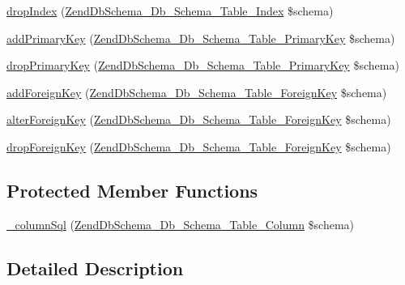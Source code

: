 \begin{DoxyCompactItemize}
\hyperlink{classZendDbSchema__Db__Schema__Generator__Pgsql__Table_ae41ebe29e67b8bf25465242d56d2db96}{drop\-Index} (\hyperlink{classZendDbSchema__Db__Schema__Table__Index}{Zend\-Db\-Schema\-\_\-\-Db\-\_\-\-Schema\-\_\-\-Table\-\_\-\-Index} \$schema)
\item 
\hyperlink{classZendDbSchema__Db__Schema__Generator__Pgsql__Table_a25c94e6add05e3ead557398dd62ae214}{add\-Primary\-Key} (\hyperlink{classZendDbSchema__Db__Schema__Table__PrimaryKey}{Zend\-Db\-Schema\-\_\-\-Db\-\_\-\-Schema\-\_\-\-Table\-\_\-\-Primary\-Key} \$schema)
\item 
\hyperlink{classZendDbSchema__Db__Schema__Generator__Pgsql__Table_a4924a2908275086b42e3dea1865aa378}{drop\-Primary\-Key} (\hyperlink{classZendDbSchema__Db__Schema__Table__PrimaryKey}{Zend\-Db\-Schema\-\_\-\-Db\-\_\-\-Schema\-\_\-\-Table\-\_\-\-Primary\-Key} \$schema)
\item 
\hyperlink{classZendDbSchema__Db__Schema__Generator__Pgsql__Table_a3365ef877cee87ce2f038f4476256a94}{add\-Foreign\-Key} (\hyperlink{classZendDbSchema__Db__Schema__Table__ForeignKey}{Zend\-Db\-Schema\-\_\-\-Db\-\_\-\-Schema\-\_\-\-Table\-\_\-\-Foreign\-Key} \$schema)
\item 
\hyperlink{classZendDbSchema__Db__Schema__Generator__Pgsql__Table_af690e11fe350fcc7da00de979233e2b5}{alter\-Foreign\-Key} (\hyperlink{classZendDbSchema__Db__Schema__Table__ForeignKey}{Zend\-Db\-Schema\-\_\-\-Db\-\_\-\-Schema\-\_\-\-Table\-\_\-\-Foreign\-Key} \$schema)
\item 
\hyperlink{classZendDbSchema__Db__Schema__Generator__Pgsql__Table_aab407f272f8993d722e31c277ce0f974}{drop\-Foreign\-Key} (\hyperlink{classZendDbSchema__Db__Schema__Table__ForeignKey}{Zend\-Db\-Schema\-\_\-\-Db\-\_\-\-Schema\-\_\-\-Table\-\_\-\-Foreign\-Key} \$schema)
\end{DoxyCompactItemize}
\subsection*{Protected Member Functions}
\begin{DoxyCompactItemize}
\item 
\hyperlink{classZendDbSchema__Db__Schema__Generator__Pgsql__Table_ad02c019065d6f7e1e6a1ba713b6c9934}{\-\_\-column\-Sql} (\hyperlink{classZendDbSchema__Db__Schema__Table__Column}{Zend\-Db\-Schema\-\_\-\-Db\-\_\-\-Schema\-\_\-\-Table\-\_\-\-Column} \$schema)
\end{DoxyCompactItemize}


\subsection{Detailed Description}


